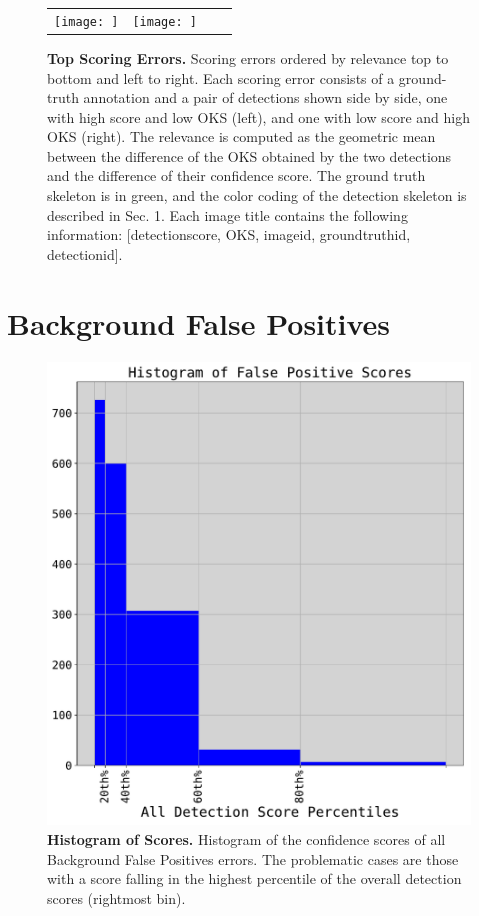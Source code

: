 \documentclass[10pt,onecolumn,letterpaper]{article}
\begin{document}
\begin{figure}[h!]
{\begin{tabular}{cc|cc}
\texttt{[image: ]} &
\texttt{[image: ]}\\
\end{tabular}
}
\vspace{-3mm}
\caption{ {\small \textbf{Top Scoring Errors.} Scoring errors ordered by relevance top to bottom and left to right.
Each scoring error consists of a ground-truth annotation and a pair of detections shown side by side, one with high score and low OKS (left),
and one with low score and high OKS (right).
The relevance is computed as the geometric mean between the difference of the OKS obtained
by the two detections and the difference of their confidence score.
The ground truth skeleton is in green, and the color coding of the detection skeleton is described in Sec. 1.
Each image title contains the following information:
[detection\textunderscore score, OKS, image\textunderscore id, ground\textunderscore truth\textunderscore id, detection\textunderscore id].}}
\end{figure}
\clearpage

\section{Background False Positives}

\begin{figure}[h!]
\centering
\includegraphics[width=.25\linewidth]{./result/rmpe/background_errors/false_positives/bckd_false_pos_scores_histogram.pdf}
\vspace{-3mm}
\caption{ {\small \textbf{Histogram of Scores.} Histogram of the confidence scores of all Background False Positives
errors. The problematic cases are those with a score falling in the highest percentile of the overall detection scores (rightmost bin).}}
\end{figure}
\end{document}
